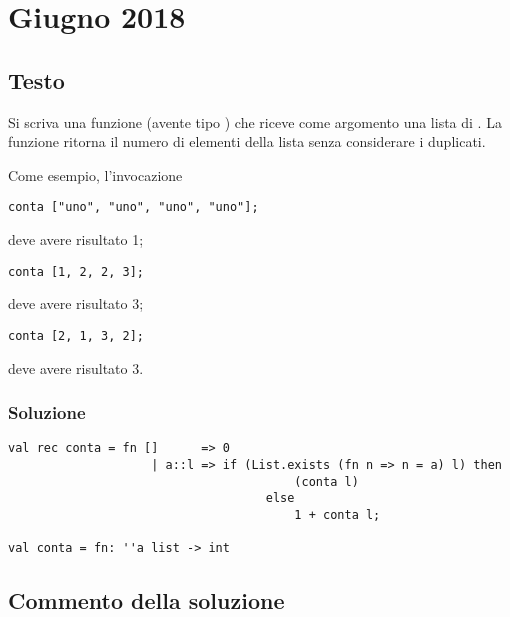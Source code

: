 \section{Giugno 2018}

\subsection{Testo}

Si scriva una funzione  (avente tipo ) che riceve come argomento una lista di .
La funzione  ritorna il numero di elementi della lista senza considerare i duplicati.

\medskip
Come esempio, l'invocazione

\begin{lstlisting}
conta ["uno", "uno", "uno", "uno"];
\end{lstlisting}

deve avere risultato 1;

\begin{lstlisting}
conta [1, 2, 2, 3];
\end{lstlisting}

deve avere risultato 3;

\begin{lstlisting}
conta [2, 1, 3, 2];
\end{lstlisting}

deve avere risultato 3.



\subsubsection{Soluzione}

\begin{lstlisting}[style = SML, caption = {Definizione della funzione \sml{conta}}]
val rec conta = fn [] 	   => 0
					| a::l => if (List.exists (fn n => n = a) l) then
		 								(conta l)
									else
										1 + conta l;

val conta = fn: ''a list -> int
\end{lstlisting}

\subsection{Commento della soluzione}
